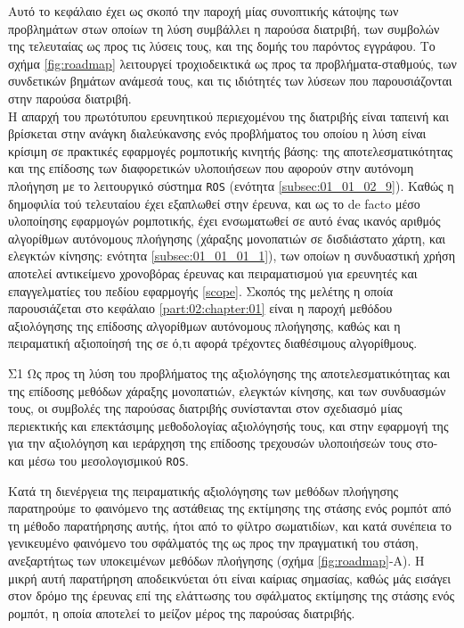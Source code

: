 Αυτό το κεφάλαιο έχει ως σκοπό την παροχή μίας συνοπτικής κάτοψης των
προβλημάτων στων οποίων τη λύση συμβάλλει η παρούσα διατριβή, των συμβολών της
τελευταίας ως προς τις λύσεις τους, και της δομής του παρόντος εγγράφου. Το
σχήμα \ref{fig:roadmap} λειτουργεί τροχιοδεικτικά ως προς τα
προβλήματα-σταθμούς, των συνδετικών βημάτων ανάμεσά τους, και τις ιδιότητές των
λύσεων που παρουσιάζονται στην παρούσα διατριβή.\\

Η απαρχή του πρωτότυπου ερευνητικού περιεχομένου της διατριβής είναι ταπεινή
και βρίσκεται στην ανάγκη διαλεύκανσης ενός προβλήματος του οποίου η λύση είναι
κρίσιμη σε πρακτικές εφαρμογές ρομποτικής κινητής βάσης: της
αποτελεσματικότητας και της επίδοσης των διαφορετικών υλοποιήσεων που αφορούν
στην αυτόνομη πλοήγηση με το λειτουργικό σύστημα \texttt{ROS} (ενότητα
\ref{subsec:01_01_02_9}). Καθώς η δημοφιλία τού τελευταίου έχει εξαπλωθεί στην
έρευνα, και ως το de facto μέσο υλοποίησης εφαρμογών ρομποτικής, έχει
ενσωματωθεί σε αυτό ένας ικανός αριθμός αλγορίθμων αυτόνομους πλοήγησης
(χάραξης μονοπατιών σε δισδιάστατο χάρτη, και ελεγκτών κίνησης: ενότητα
\ref{subsec:01_01_01_1}), των οποίων η συνδυαστική χρήση αποτελεί αντικείμενο
χρονοβόρας έρευνας και πειραματισμού για ερευνητές και επαγγελματίες του πεδίου
εφαρμογής \ref{scope}. Σκοπός της μελέτης η οποία παρουσιάζεται στο κεφάλαιο
\ref{part:02:chapter:01} είναι η παροχή μεθόδου αξιολόγησης της επίδοσης
αλγορίθμων αυτόνομους πλοήγησης, καθώς και η πειραματική αξιοποίησή της σε ό,τι
αφορά τρέχοντες διαθέσιμους αλγορίθμους.

\begin{bw_box}
\begin{customcontribution}{Σ1}
  \label{contribution:01}
  Ως προς τη λύση του προβλήματος της αξιολόγησης της αποτελεσματικότητας και
  της επίδοσης μεθόδων χάραξης μονοπατιών, ελεγκτών κίνησης, και των συνδυασμών
  τους, οι συμβολές της παρούσας διατριβής συνίστανται στον σχεδιασμό μίας
  περιεκτικής και επεκτάσιμης μεθοδολογίας αξιολόγησής τους, και στην εφαρμογή
  της για την αξιολόγηση και ιεράρχηση της επίδοσης τρεχουσών υλοποιήσεών τους
  στο- και μέσω του μεσολογισμικού \texttt{ROS}. \cite{Filotheou2020b}
\end{customcontribution}
\end{bw_box}

Κατά τη διενέργεια της πειραματικής αξιολόγησης των μεθόδων πλοήγησης
παρατηρούμε το φαινόμενο της αστάθειας της εκτίμησης της στάσης ενός ρομπότ από
τη μέθοδο παρατήρησης αυτής, ήτοι από το φίλτρο σωματιδίων, και κατά συνέπεια
το γενικευμένο φαινόμενο του σφάλματός της ως προς την πραγματική του στάση,
ανεξαρτήτως των υποκειμένων μεθόδων πλοήγησης (σχήμα \ref{fig:roadmap}-Α). Η
μικρή αυτή παρατήρηση αποδεικνύεται ότι είναι καίριας σημασίας, καθώς μάς
εισάγει στον δρόμο της έρευνας επί της ελάττωσης του σφάλματος εκτίμησης της
στάσης ενός ρομπότ, η οποία αποτελεί το μείζον μέρος της παρούσας διατριβής.\\

